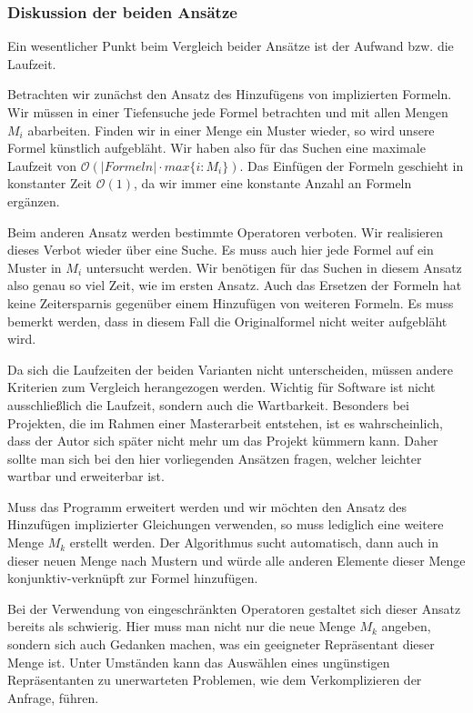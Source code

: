 
\subsubsection{Diskussion der beiden Ansätze}

Ein wesentlicher Punkt beim Vergleich beider Ansätze ist der Aufwand bzw. die Laufzeit. 

Betrachten wir zunächst den Ansatz des Hinzufügens von implizierten Formeln. Wir müssen in einer Tiefensuche jede Formel betrachten und mit allen Mengen $M_i$ abarbeiten. Finden wir in einer Menge ein Muster wieder, so wird unsere Formel künstlich aufgebläht. Wir haben also für das Suchen eine maximale Laufzeit von $\mathcal{O}(\mathit{\vert Formeln\vert \cdot max\{i : M_i\}})$. Das Einfügen der Formeln geschieht in konstanter Zeit $\mathcal{O}(1)$, da wir immer eine konstante Anzahl an Formeln ergänzen.

Beim anderen Ansatz werden bestimmte Operatoren verboten. Wir realisieren dieses Verbot wieder über eine Suche. Es muss auch hier jede Formel auf ein Muster in $M_i$ untersucht werden. Wir benötigen für das Suchen in diesem Ansatz also genau so viel Zeit, wie im ersten Ansatz. Auch das Ersetzen der Formeln hat keine Zeitersparnis gegenüber einem Hinzufügen von weiteren Formeln. Es muss bemerkt werden, dass in diesem Fall die Originalformel nicht weiter aufgebläht wird.

Da sich die Laufzeiten der beiden Varianten nicht unterscheiden, müssen andere Kriterien zum Vergleich herangezogen werden. Wichtig für Software ist nicht ausschließlich die Laufzeit, sondern auch die Wartbarkeit. Besonders bei Projekten, die im Rahmen einer Masterarbeit entstehen, ist es wahrscheinlich, dass der Autor sich später nicht mehr um das Projekt kümmern kann. Daher sollte man sich bei den hier vorliegenden Ansätzen fragen, welcher leichter wartbar und erweiterbar ist.

Muss das Programm erweitert werden und wir möchten den Ansatz des Hinzufügen implizierter Gleichungen verwenden, so muss lediglich eine weitere Menge $M_k$ erstellt werden. Der Algorithmus sucht automatisch, dann auch in dieser neuen Menge nach Mustern und würde alle anderen Elemente dieser Menge konjunktiv-verknüpft zur Formel hinzufügen. 

Bei der Verwendung von eingeschränkten Operatoren gestaltet sich dieser Ansatz bereits als schwierig. Hier muss man nicht nur die neue Menge $M_k$ angeben, sondern sich auch Gedanken machen, was ein geeigneter Repräsentant dieser Menge ist. Unter Umständen kann das Auswählen eines ungünstigen Repräsentanten zu unerwarteten Problemen, wie dem Verkomplizieren der Anfrage, führen.

